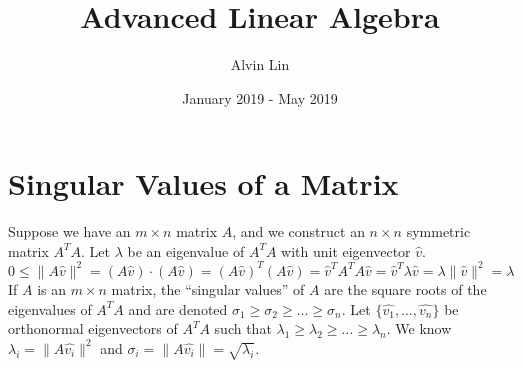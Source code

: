 \documentclass{math}
\title{Advanced Linear Algebra}
\author{Alvin Lin}
\date{January 2019 - May 2019}
\begin{document}
\maketitle

\section*{Singular Values of a Matrix}
Suppose we have an \( m\times n \) matrix \( A \), and we construct an
\( n\times n \) symmetric matrix \( A^TA \). Let \( \lambda \) be an
eigenvalue of \( A^TA \) with unit eigenvector \( \hat{v} \).
\[ 0 \le \|A\hat{v}\|^2 = (A\hat{v})\cdot(A\hat{v}) = (A\hat{v})^T(A\hat{v}) =
  \hat{v}^TA^TA\hat{v} = \hat{v}^T\lambda\hat{v} = \lambda\|\hat{v}\|^2 =
  \lambda \]
If \( A \) is an \( m\times n \) matrix, the ``singular values'' of \( A \) are
the square roots of the eigenvalues of \( A^TA \) and are denoted
\( \sigma_1 \ge \sigma_2 \ge \dots \ge \sigma_n \).
Let \( \{\hat{v_1},\dots,\hat{v_n}\} \) be orthonormal eigenvectors of
\( A^TA \) such that \( \lambda_1 \ge \lambda_2 \ge \dots \ge \lambda_n \).
We know \( \lambda_i = \|A\hat{v_i}\|^2 \) and \( \sigma_i = \|A\hat{v_i}\| =
\sqrt{\lambda_i} \).
\end{document}
